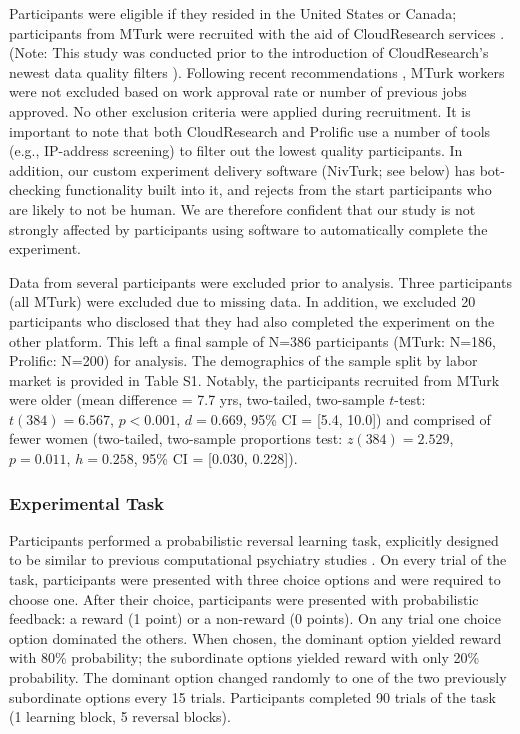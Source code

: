 \documentclass[a4paper,notitlepage,12pt]{article}
\begin{document}
Participants were eligible if they resided in the United States or Canada; participants from MTurk were recruited with the aid of CloudResearch services \cite{litman2017turkprime}. (Note: This study was conducted prior to the introduction of CloudResearch's newest data quality filters \cite{cloudresearch_2020}). Following recent recommendations \cite{robinson2019tapped}, MTurk workers were not excluded based on work approval rate or number of previous jobs approved. No other exclusion criteria were applied during recruitment. It is important to note that both CloudResearch and Prolific use a number of tools (e.g., IP-address screening) to filter out the lowest quality participants. In addition, our custom experiment delivery software (NivTurk; see below) has bot-checking functionality built into it, and rejects from the start participants who are likely to not be human. We are therefore confident that our study is not strongly affected by participants using software to automatically complete the experiment.

Data from several participants were excluded prior to analysis. Three participants (all MTurk) were excluded due to missing data. In addition, we excluded 20 participants who disclosed that they had also completed the experiment on the other platform. This left a final sample of N=386 participants (MTurk: N=186, Prolific: N=200) for analysis. The demographics of the sample split by labor market is provided in Table S1. Notably, the participants recruited from MTurk were older (mean difference = 7.7 yrs, two-tailed, two-sample $t$-test: $t(384)=6.567$, $p<0.001$, $d=0.669$, 95\% CI = [5.4, 10.0]) and comprised of fewer women (two-tailed, two-sample proportions test: $z(384)=2.529$, $p=0.011$, $h=0.258$, 95\% CI = [0.030, 0.228]). 

\subsubsection*{Experimental Task}

Participants performed a probabilistic reversal learning task, explicitly designed to be similar to previous computational psychiatry studies \cite{waltz2007probabilistic, mukherjee_reward_2020}. On every trial of the task, participants were presented with three choice options and were required to choose one. After their choice, participants were presented with probabilistic feedback: a reward (1 point) or a non-reward (0 points). On any trial one choice option dominated the others. When chosen, the dominant option yielded reward with 80\% probability; the subordinate options yielded reward with only 20\% probability. The dominant option changed randomly to one of the two previously subordinate options every 15 trials. Participants completed 90 trials of the task (1 learning block, 5 reversal blocks). 
\end{document}
